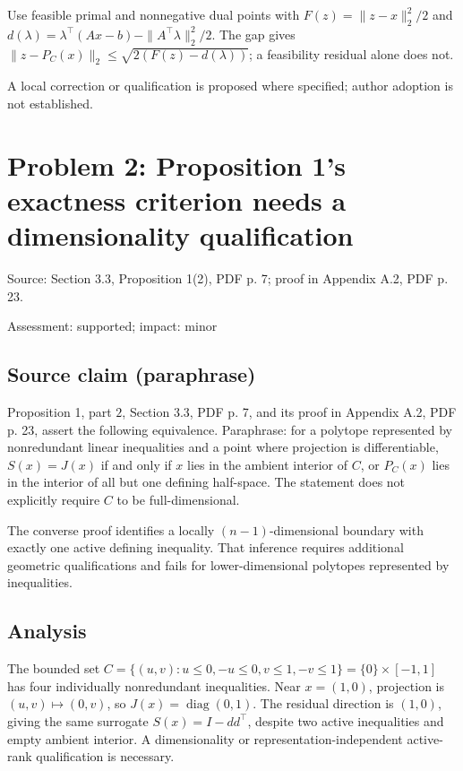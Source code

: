 \documentclass[11pt]{article}
\begin{document}
Use feasible primal and nonnegative dual points with \(F(z)=\|z-x\|_2^2/2\) and \(d(\lambda)=\lambda^\top(Ax-b)-\|A^\top\lambda\|_2^2/2\). The gap gives \(\|z-P_C(x)\|_2\le\sqrt{2(F(z)-d(\lambda))}\); a feasibility residual alone does not.

A local correction or qualification is proposed where specified; author adoption is not established.

\section*{Problem 2: Proposition 1’s exactness criterion needs a dimensionality qualification}

Source: Section 3.3, Proposition 1(2), PDF p. 7; proof in Appendix A.2, PDF p. 23.

Assessment: supported; impact: minor

\subsection*{Source claim (paraphrase)}

Proposition 1, part \(2\), Section 3.3, PDF p. 7, and its proof in Appendix A.2, PDF p. 23, assert the following equivalence. Paraphrase: for a polytope represented by nonredundant linear inequalities and a point where projection is differentiable, \(S(x)=J(x)\) if and only if \(x\) lies in the ambient interior of \(C\), or \(P_C(x)\) lies in the interior of all but one defining half-space. The statement does not explicitly require \(C\) to be full-dimensional.

The converse proof identifies a locally \((n-1)\)-dimensional boundary with exactly one active defining inequality. That inference requires additional geometric qualifications and fails for lower-dimensional polytopes represented by inequalities.

\subsection*{Analysis}

The bounded set \(C=\{(u,v):u\le0,-u\le0,v\le1,-v\le1\}=\{0\}\times[-1,1]\) has four individually nonredundant inequalities. Near \(x=(1,0)\), projection is \((u,v)\mapsto(0,v)\), so \(J(x)=\operatorname{diag}(0,1)\). The residual direction is \((1,0)\), giving the same surrogate \(S(x)=I-dd^\top\), despite two active inequalities and empty ambient interior. A dimensionality or representation-independent active-rank qualification is necessary.
\end{document}
